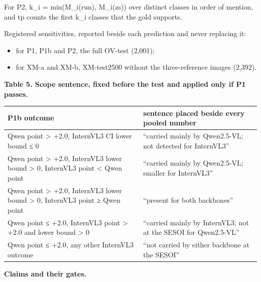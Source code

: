 For P2, k\_i = min(\textbar M\_i(run)\textbar, \textbar M\_i(zs)\textbar) over distinct classes in
order of mention, and tp counts the first k\_i classes that the gold supports.

Registered sensitivities, reported beside each prediction and never replacing it:

\begin{itemize}
\tightlist
\item
  for P1, P1b and P2, the full OV-test (2,001);
\item
  for XM-a and XM-b, XM-test2500 without the three-reference images (2,392).
\end{itemize}

\textbf{Table 5. Scope sentence, fixed before the test and applied only if P1 passes.}

\begin{longtable}[]{@{}
  >{\raggedright\arraybackslash}p{}
  >{\raggedright\arraybackslash}p{}@{}}
\toprule\noalign{}
\begin{minipage}[b]{\linewidth}\raggedright
P1b outcome
\end{minipage} & \begin{minipage}[b]{\linewidth}\raggedright
sentence placed beside every pooled number
\end{minipage} \\
\midrule\noalign{}
\endhead
\bottomrule\noalign{}
\endlastfoot
Qwen point \textgreater{} +2.0, InternVL3 CI lower bound ≤ 0 & ``carried mainly by Qwen2.5-VL; not
detected for InternVL3'' \\
Qwen point \textgreater{} +2.0, InternVL3 lower bound \textgreater{} 0, InternVL3 point \textless{}
Qwen point & ``carried mainly by Qwen2.5-VL; smaller for InternVL3'' \\
Qwen point \textgreater{} +2.0, InternVL3 lower bound \textgreater{} 0, InternVL3 point ≥ Qwen point
& ``present for both backbones'' \\
Qwen point ≤ +2.0, InternVL3 point \textgreater{} +2.0 and lower bound \textgreater{} 0 & ``carried
mainly by InternVL3; not at the SESOI for Qwen2.5-VL'' \\
Qwen point ≤ +2.0, any other InternVL3 outcome & ``not carried by either backbone at the SESOI'' \\
\end{longtable}

\textbf{Claims and their gates.}

